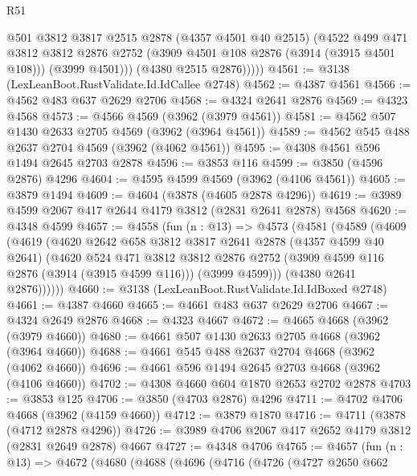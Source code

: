 \begin{lexlean}{R51}
\begin{coremodule}
              @501
              @3812
              @3817
              @2515
              @2878
              (@4357 @4501 @40 @2515)
              (@4522
                @499
                @471
                @3812
                @3812
                @2876
                @2752
                (@3909 @4501 @108 @2876 (@3914 (@3915 @4501 @108)))
                (@3999 @4501)))
            (@4380 @2515 @2876)))))
@4561 := @3138 (LexLeanBoot.RustValidate.Id.IdCallee @2748)
@4562 := @4387 @4561
@4566 := @4562 @483 @637 @2629 @2706
@4568 := @4324 @2641 @2876
@4569 := @4323 @4568
@4573 := @4566 @4569 (@3962 (@3979 @4561))
@4581 := @4562 @507 @1430 @2633 @2705 @4569 (@3962 (@3964 @4561))
@4589 := @4562 @545 @488 @2637 @2704 @4569 (@3962 (@4062 @4561))
@4595 := @4308 @4561 @596 @1494 @2645 @2703 @2878
@4596 := @3853 @116
@4599 := @3850 (@4596 @2876) @4296
@4604 := @4595 @4599 @4569 (@3962 (@4106 @4561))
@4605 := @3879 @1494
@4609 := @4604 (@3878 (@4605 @2878 @4296))
@4619 := @3989 @4599 @2067 @417 @2644 @4179 @3812 (@2831 @2641 @2878) @4568
@4620 := @4348 @4599
@4657 := @4558
    (fun (n : @13) =>
    @4573
      (@4581
        (@4589
          (@4609
            (@4619
              (@4620
                @2642
                @658
                @3812
                @3817
                @2641
                @2878
                (@4357 @4599 @40 @2641)
                (@4620
                  @524
                  @471
                  @3812
                  @3812
                  @2876
                  @2752
                  (@3909 @4599 @116 @2876 (@3914 (@3915 @4599 @116)))
                  (@3999 @4599)))
              (@4380 @2641 @2876))))))
@4660 := @3138 (LexLeanBoot.RustValidate.Id.IdBoxed @2748)
@4661 := @4387 @4660
@4665 := @4661 @483 @637 @2629 @2706
@4667 := @4324 @2649 @2876
@4668 := @4323 @4667
@4672 := @4665 @4668 (@3962 (@3979 @4660))
@4680 := @4661 @507 @1430 @2633 @2705 @4668 (@3962 (@3964 @4660))
@4688 := @4661 @545 @488 @2637 @2704 @4668 (@3962 (@4062 @4660))
@4696 := @4661 @596 @1494 @2645 @2703 @4668 (@3962 (@4106 @4660))
@4702 := @4308 @4660 @604 @1870 @2653 @2702 @2878
@4703 := @3853 @125
@4706 := @3850 (@4703 @2876) @4296
@4711 := @4702 @4706 @4668 (@3962 (@4159 @4660))
@4712 := @3879 @1870
@4716 := @4711 (@3878 (@4712 @2878 @4296))
@4726 := @3989 @4706 @2067 @417 @2652 @4179 @3812 (@2831 @2649 @2878) @4667
@4727 := @4348 @4706
@4765 := @4657
    (fun (n : @13) =>
    @4672
      (@4680
        (@4688
          (@4696
            (@4716
              (@4726
                (@4727
                  @2650
                  @662

\end{coremodule}
\end{lexlean}
